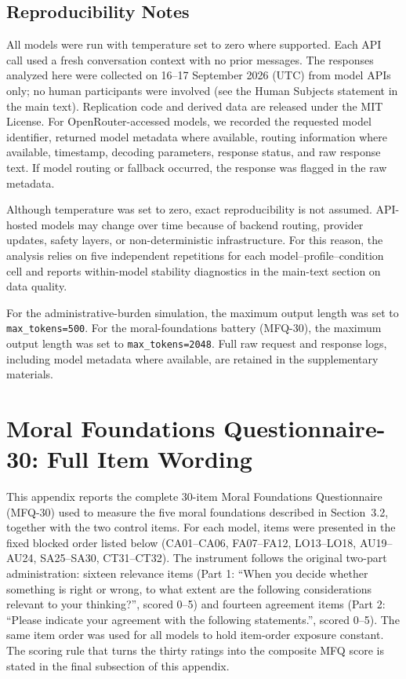\subsection*{Reproducibility Notes}

All models were run with temperature set to zero where supported. Each API call used a fresh conversation context with no prior messages. The responses analyzed here were collected on 16--17 September 2026 (UTC) from model APIs only; no human participants were involved (see the Human Subjects statement in the main text). Replication code and derived data are released under the MIT License. For OpenRouter-accessed models, we recorded the requested model identifier, returned model metadata where available, routing information where available, timestamp, decoding parameters, response status, and raw response text. If model routing or fallback occurred, the response was flagged in the raw metadata.

Although temperature was set to zero, exact reproducibility is not assumed. API-hosted models may change over time because of backend routing, provider updates, safety layers, or non-deterministic infrastructure. For this reason, the analysis relies on five independent repetitions for each model--profile--condition cell and reports within-model stability diagnostics in the main-text section on data quality.

For the administrative-burden simulation, the maximum output length was set to \texttt{max\_tokens=500}. For the moral-foundations battery (MFQ-30), the maximum output length was set to \texttt{max\_tokens=2048}. Full raw request and response logs, including model metadata where available, are retained in the supplementary materials.
\clearpage   %
\section{Moral Foundations Questionnaire-30: Full Item Wording} \label{app:orientation-items} This appendix reports the complete 30-item Moral Foundations Questionnaire (MFQ-30) \citep{Graham2011} used to measure the five moral foundations described in Section~3.2, together with the two control items. For each model, items were presented in the fixed blocked order listed below (CA01--CA06, FA07--FA12, LO13--LO18, AU19--AU24, SA25--SA30, CT31--CT32). The instrument follows the original two-part administration: sixteen relevance items (Part 1: ``When you decide whether something is right or wrong, to what extent are the following considerations relevant to your thinking?'', scored 0--5) and fourteen agreement items (Part 2: ``Please indicate your agreement with the following statements.'', scored 0--5). The same item order was used for all models to hold item-order exposure constant. The scoring rule that turns the thirty ratings into the composite MFQ score is stated in the final subsection of this appendix.
